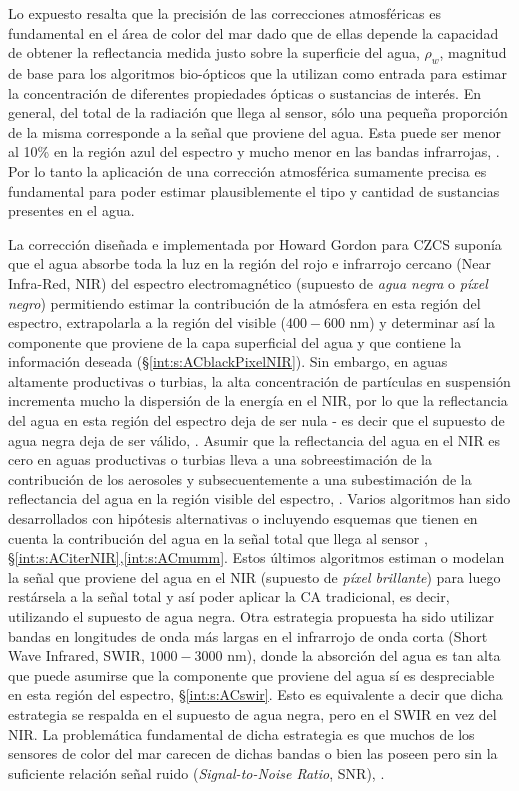     Lo expuesto resalta que la precisión de las correcciones atmosféricas es fundamental en el área de color del mar dado que de ellas depende la capacidad de obtener la reflectancia medida justo sobre la superficie del agua, $\rho_{w}$, magnitud de base para los algoritmos bio-ópticos que la utilizan como entrada para estimar la concentración de diferentes propiedades ópticas o sustancias de interés. En general, del total de la radiación que llega al sensor, sólo una pequeña proporción de la misma corresponde a la señal que proviene del agua. Esta puede ser menor al 10\% en la región azul del espectro y mucho menor en las bandas infrarrojas, \cite{gordon1999}. Por lo tanto la aplicación de una corrección atmosférica sumamente precisa es fundamental para poder estimar plausiblemente el tipo y cantidad de sustancias presentes en el agua.
    
    La corrección diseñada e implementada por Howard Gordon para CZCS suponía que el agua absorbe toda la luz en la región del rojo e infrarrojo cercano (Near Infra-Red, NIR) del espectro electromagnético (supuesto de \textit{agua negra} o \textit{píxel negro}) permitiendo estimar la contribución de la atmósfera en esta región del espectro, extrapolarla a la región del visible ($400-600$ nm) y determinar así la componente que proviene de la capa superficial del agua y que contiene la información deseada (\S \ref{int:s:ACblackPixelNIR}). Sin embargo, en aguas altamente productivas o turbias, la alta concentración de partículas en suspensión incrementa mucho la dispersión de la energía en el NIR, por lo que la reflectancia del agua en esta región del espectro deja de ser nula - es decir que el supuesto de agua negra deja de ser válido, \cite{siegel2000}\cite{stumpf2003}. Asumir que la reflectancia del agua en el NIR es cero en aguas productivas o turbias lleva a una sobreestimación de la contribución de los aerosoles y subsecuentemente a una subestimación de la reflectancia del agua en la región visible del espectro, \cite{bailey2010}. Varios algoritmos han sido desarrollados con hipótesis alternativas o incluyendo esquemas que tienen en cuenta la contribución del agua en la señal total que llega al sensor \cite{stumpf2003}\cite{bailey2010}\cite{moore2011}\cite{ruddick2000}\cite{ruddick2006}, \S \ref{int:s:ACiterNIR},\ref{int:s:ACmumm}. Estos últimos algoritmos estiman o modelan la señal que proviene del agua en el NIR (supuesto de \textit{píxel brillante}) para luego restársela a la señal total y así poder aplicar la CA tradicional, es decir, utilizando el supuesto de agua negra. Otra estrategia propuesta ha sido utilizar bandas en longitudes de onda más largas en el infrarrojo de onda corta (Short Wave Infrared, SWIR, $1000-3000$ nm), donde la absorción del agua es tan alta que puede asumirse que la componente que proviene del agua sí es despreciable en esta región del espectro, \S \ref{int:s:ACswir}. Esto es equivalente a decir que dicha estrategia se respalda en el supuesto de agua negra, pero en el SWIR en vez del NIR. La problemática fundamental de dicha estrategia es que muchos de los sensores de color del mar carecen de dichas bandas o bien las poseen pero sin la suficiente relación señal ruido (\textit{Signal-to-Noise Ratio}, SNR), \cite{wang2018}.

